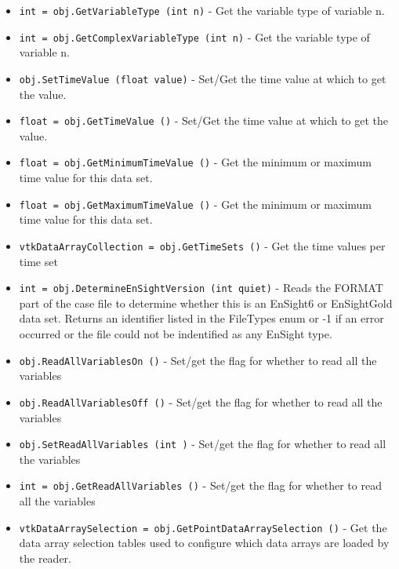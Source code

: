 \begin{itemize}
\item  \verb|int = obj.GetVariableType (int n)| -  Get the variable type of variable n.

\item  \verb|int = obj.GetComplexVariableType (int n)| -  Get the variable type of variable n.

\item  \verb|obj.SetTimeValue (float value)| -  Set/Get the time value at which to get the value.

\item  \verb|float = obj.GetTimeValue ()| -  Set/Get the time value at which to get the value.

\item  \verb|float = obj.GetMinimumTimeValue ()| -  Get the minimum or maximum time value for this data set.

\item  \verb|float = obj.GetMaximumTimeValue ()| -  Get the minimum or maximum time value for this data set.

\item  \verb|vtkDataArrayCollection = obj.GetTimeSets ()| -  Get the time values per time set

\item  \verb|int = obj.DetermineEnSightVersion (int quiet)| -  Reads the FORMAT part of the case file to determine whether this is an
 EnSight6 or EnSightGold data set.  Returns an identifier listed in
 the FileTypes enum or -1 if an error occurred or the file could not
 be indentified as any EnSight type.

\item  \verb|obj.ReadAllVariablesOn ()| -  Set/get the flag for whether to read all the variables

\item  \verb|obj.ReadAllVariablesOff ()| -  Set/get the flag for whether to read all the variables

\item  \verb|obj.SetReadAllVariables (int )| -  Set/get the flag for whether to read all the variables

\item  \verb|int = obj.GetReadAllVariables ()| -  Set/get the flag for whether to read all the variables

\item  \verb|vtkDataArraySelection = obj.GetPointDataArraySelection ()| -  Get the data array selection tables used to configure which data
 arrays are loaded by the reader.


\end{itemize}
